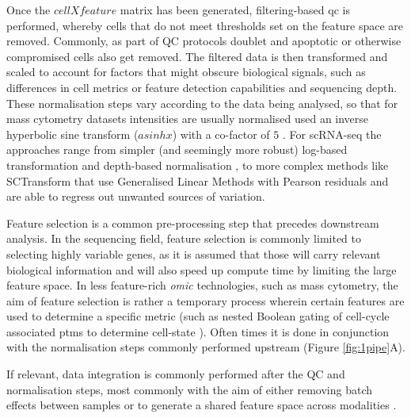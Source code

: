 Once the $cell X feature$ matrix has been generated, filtering-based \acrfull{qc} is performed, whereby cells that do not meet thresholds set on the feature space are removed. Commonly, as part of QC protocols doublet and apoptotic or otherwise compromised cells also get removed.
The filtered data is then transformed and scaled to account for factors that might obscure biological signals, such as differences in cell metrics or feature detection capabilities and sequencing depth. These normalisation steps vary according to the data being analysed, so that for mass cytometry datasets intensities are usually normalised used an inverse hyperbolic sine transform (\(asinh x\)) with a co-factor of \(5\) \cite{bendall_single-cell_2011,guldberg_computational_2023}. For scRNA-seq the approaches range from simpler (and seemingly more robust) log-based transformation \cite{ahlmann-eltze_comparison_2023} and depth-based normalisation \cite{booeshaghi_depth_2022}, to more complex methods like SCTransform \cite{hafemeister_normalization_2019} that use Generalised Linear Methods with Pearson residuals and are able to regress out unwanted sources of variation.

Feature selection is a common pre-processing step that precedes downstream analysis. In the sequencing field, feature selection is commonly limited to selecting highly variable genes, as it is assumed that those will carry relevant biological information and will also speed up compute time by limiting the large feature space. In less feature-rich \emph{omic} technologies, such as mass cytometry, the aim of feature selection is rather a temporary process wherein certain features are used to determine a specific metric (such as nested Boolean gating of cell-cycle associated \acrshort{ptm}s to determine cell-state \cite{behbehani_single-cell_2012,qin_cell-type-specific_2020}). Often times it is done in conjunction with the normalisation steps commonly performed upstream (Figure \ref{fig:1pipe}A).

If relevant, data integration is commonly performed after the QC and normalisation steps, most commonly with the aim of either removing batch effects between samples or to generate a shared feature space across modalities \cite{cao_multi-omics_2022}. 

